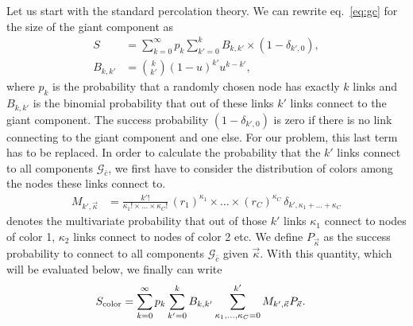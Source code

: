 \documentclass[aps, pre, onecolumn, a4paper, floatfix]{revtex4}
\begin{document}
Let us start with the standard percolation theory. We can rewrite eq.~\ref{eq:gc} for the size of 
the giant component as 
\begin{align}
S &= \sum_{k=0}^{\infty}p_k \sum_{k'=0}^{k} B_{k,k'} \times \left( 1-\delta_{k',0}\right),\\
B_{k,k'} &={k \choose k'}(1-u)^{k'}u^{k-k'},
\end{align}
where $p_k$ is the probability that a randomly chosen node has exactly $k$ links and $B_{k,k'}$
is the binomial probability that out of these links $k'$ links connect to the giant component. The 
success probability $\left( 1-\delta_{k',0}\right)$ is zero 
if there is no link connecting to the giant component and one else. 
For our problem, this last term has to be replaced. In order to calculate 
the probability that the $k'$ links connect to all components ${\mathcal G}_{\bar c}$, 
we first have to consider the distribution of colors among the nodes these links connect to. 
\begin{align}
M_{k',\vec \kappa} &=\frac{k'!}{\kappa_1! \times \dots \times \kappa_C!} \,
(r_1)^{\kappa_1} \times \dots \times (r_C)^{\kappa_C}\,
\delta_{k',\kappa_1+\dots + \kappa_C}\label{eq:R_kk}
\end{align}
denotes the multivariate probability that out of those $k'$ links $\kappa_1$ connect to nodes of 
color 1, $\kappa_2$ links connect to nodes of color 2 etc. We define $P_{\vec \kappa}$ as the 
success probability to connect to all components ${\mathcal G}_{\bar c}$ given $\vec \kappa$. 
With this quantity, which will be evaluated below, we finally can write 
\begin{align}
S_{\rm color} &= \sum_{k=0}^{\infty}p_k \sum_{k'=0}^{k} B_{k,k'} 
\sum_{\kappa_1,\dots, \kappa_C=0}^{k'} M_{k',\vec \kappa} 
P_{\vec \kappa}.\label{eq:s_color}
\end{align}
\end{document}
